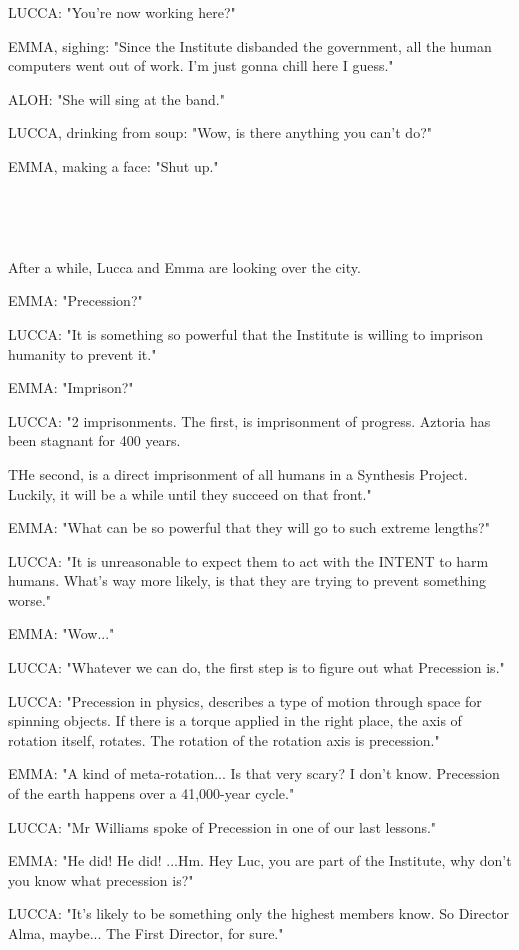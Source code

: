 \documentclass[11pt]{article}
\begin{document}
LUCCA: "You're now working here?"

EMMA, sighing: "Since the Institute disbanded the government, all the human computers went out of work.
I'm just gonna chill here I guess."

ALOH: "She will sing at the band."

LUCCA, drinking from soup: "Wow, is there anything you can't do?"

EMMA, making a face: "Shut up."

\ 

\ 

After a while, Lucca and Emma are looking over the city.

EMMA: "Precession?"

LUCCA: "It is something so powerful that the Institute is willing to imprison humanity to prevent it."

EMMA: "Imprison?"

LUCCA: "2 imprisonments.
The first, is imprisonment of progress.
Aztoria has been stagnant for 400 years.

THe second, is a direct imprisonment of all humans in a Synthesis Project.
Luckily, it will be a while until they succeed on that front."

EMMA: "What can be so powerful that they will go to such extreme lengths?"

LUCCA: "It is unreasonable to expect them to act with the INTENT to harm humans. 
What's way more likely, is that they are trying to prevent something worse."

EMMA: "Wow..."

LUCCA: "Whatever we can do, the first step is to figure out what Precession is."

LUCCA: "Precession in physics, describes a type of motion through space for spinning objects.
If there is a torque applied in the right place, the axis of rotation itself, rotates.
The rotation of the rotation axis is precession."

EMMA: "A kind of meta-rotation...
Is that very scary? I don't know.
Precession of the earth happens over a 41,000-year cycle."

LUCCA: "Mr Williams spoke of Precession in one of our last lessons."

EMMA: "He did! He did!
...Hm. Hey Luc, you are part of the Institute, why don't you know what precession is?"

LUCCA: "It's likely to be something only the highest members know.
So Director Alma, maybe...
The First Director, for sure."
\end{document}

